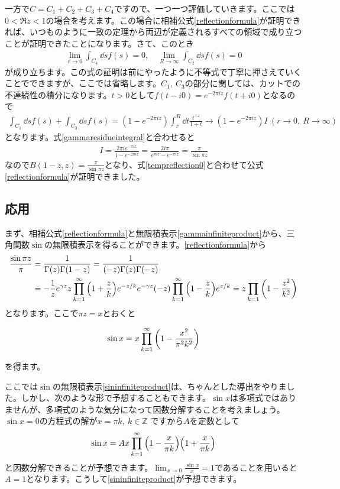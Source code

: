 \documentclass[report,paper=a4, fontsize=12pt, line_length=16cm, number_of_lines=33,dvipdfmx]{jlreq}
\newenvironment{important}{\begin{tcolorbox}[
  colback = white,
  colframe = red!35,
  boxrule = 2mm,
  fonttitle = \bfseries,
  after = \noindent] }{\end{tcolorbox}}
\numberwithin{equation}{section}
\newcommand{\Zb}{\mathbb{Z}}
\begin{document}
一方で$C=C_1+C_2+C_3+C_4$ですので、一つ一つ評価していきます。ここでは$0<\Re z <1$の場合を考えます。この場合に相補公式\eqref{reflectionformula}が証明できれば、いつものように一致の定理から両辺が定義されるすべての領域で成り立つことが証明できたことになります。さて、このとき
\begin{align}
  \lim_{r\to 0}\int_{C_4}\dd{s}f(s)=0,\quad
  \lim_{R\to \infty}\int_{C_2}\dd{s}f(s)=0
\end{align}
が成り立ちます。この式の証明は前にやったように不等式で丁寧に押さえていくことでできますが、ここでは省略します。$C_1,\ C_3$の部分に関しては、カットでの不連続性の積分になります。$t>0$として$f(t-i0)=e^{-2\pi i z}f(t+i0)$となるので
\begin{align}
  \int_{C_1}\dd{s}f(s)+\int_{C_3}\dd{s}f(s)
  =(1-e^{-2\pi i z})\int_{r}^{R}\dd{t}\frac{t^{-z}}{1+t}
  \to (1-e^{-2\pi i z})I\ (r\to 0,\ R\to \infty)
\end{align}
となります。式\eqref{gammaresidueintegral}と合わせると
\begin{align}
  I=\frac{2\pi i e^{-\pi i z}}{1-e^{-2\pi i z}}=\frac{2i\pi}{e^{\pi i z}-e^{-\pi i z}}=\frac{\pi}{\sin\pi z}
\end{align}
なので$B(1-z,z)=\frac{\pi}{\sin\pi z}$となり、式\eqref{tempreflection0}と合わせて公式\eqref{reflectionformula}が証明できました。

\subsection{応用}
まず、相補公式\eqref{reflectionformula}と無限積表示\eqref{gammainfiniteproduct}から、三角関数$\sin$の無限積表示を得ることができます。\eqref{reflectionformula}から
\begin{align}
  \frac{\sin \pi z}{\pi}
  &=\frac{1}{\Gamma(z)\Gamma(1-z)}
  =\frac{1}{(-z)\Gamma(z)\Gamma(-z)}\nonumber\\
  &=-\frac{1}{z}e^{\gamma z}z \prod_{k=1}^{\infty}\qty(1+\frac{z}{k})e^{-z/k}e^{-\gamma z}(-z)\prod_{k=1}^{\infty}\qty(1-\frac{z}{k})e^{z/k}
  =z\prod_{k=1}\qty(1-\frac{z^2}{k^2})
\end{align}
となります。ここで$\pi z=x$とおくと
\begin{important}
  \begin{align}
    \sin x = x \prod_{k=1}^{\infty}\qty(1-\frac{x^2}{\pi^2 k^2})
    \label{sininfiniteproduct}
  \end{align}
\end{important}
を得ます。

ここでは$\sin$の無限積表示\eqref{sininfiniteproduct}は、ちゃんとした導出をやりました。しかし、次のような形で予想することもできます。$\sin x$は多項式ではありませんが、多項式のような気分になって因数分解することを考えましょう。$\sin x=0$の方程式の解が$x=\pi k,\ k\in \Zb$
ですから$A$を定数として
\begin{align}
  \sin x = A x \prod_{k=1}^{\infty}\qty(1-\frac{x}{\pi k})\qty(1+\frac{x}{\pi k})
\end{align}
と因数分解できることが予想できます。$\lim_{x\to 0}\frac{\sin x}{x}=1$であることを用いると$A=1$となります。こうして\eqref{sininfiniteproduct}が予想できます。
\end{document}
